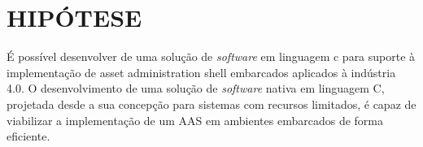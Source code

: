 \chapter{HIPÓTESE}
É possível desenvolver de uma solução de \textit{software} em linguagem c para suporte à implementação de asset administration shell embarcados aplicados à indústria 4.0. O desenvolvimento de uma solução de \textit{software} nativa em linguagem C, projetada desde a sua concepção para sistemas com recursos limitados, é capaz de viabilizar a implementação de um AAS em ambientes embarcados de forma eficiente.